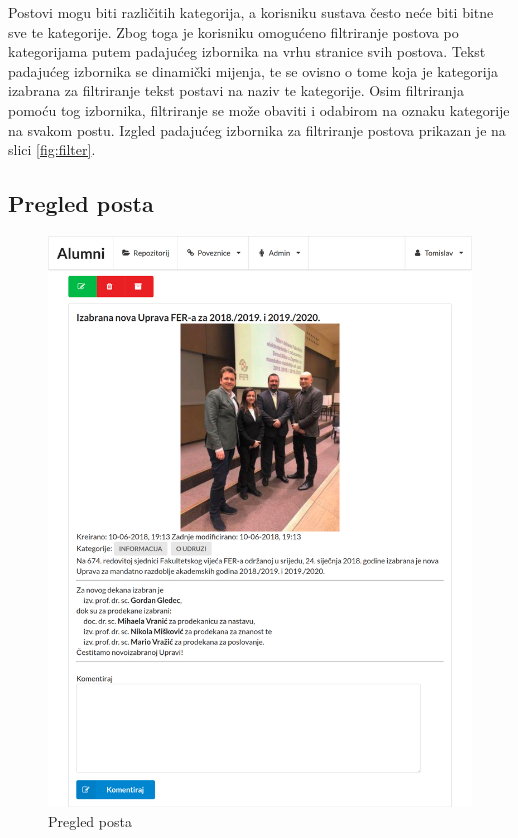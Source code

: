 \documentclass[zavrsni, numeric]{fer}
\begin{document}
Postovi mogu biti različitih kategorija, a korisniku sustava često neće biti bitne sve te kategorije. Zbog toga je korisniku omogućeno filtriranje postova po kategorijama putem padajućeg izbornika na vrhu stranice svih postova. Tekst padajućeg izbornika se dinamički mijenja, te se ovisno o tome koja je kategorija izabrana za filtriranje tekst postavi na naziv te kategorije. Osim filtriranja pomoću tog izbornika, filtriranje se može obaviti i odabirom na oznaku kategorije na svakom postu. Izgled padajućeg izbornika za filtriranje postova prikazan je na slici \ref{fig:filter}.

\subsection{Pregled posta}

\begin{figure}[H]
	\centering
	\includegraphics[width=13cm]{slike/post.png}
	\caption{Pregled posta}
	\label{fig:post}
\end{figure}
\end{document}
